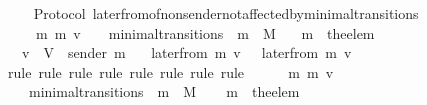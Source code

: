 \begin{isabellebody}
%
\isadelimproof
\ \ %
\endisadelimproof
%
\isatagproof
{}\isamarkupfalse%
%
\endisatagproof
{\isafoldproof}%
%
\isadelimproof
\isanewline
%
\endisadelimproof
\isanewline
\isanewline
\isanewline
\isanewline
\isanewline
\isanewline
{}\isamarkupfalse%
\ {\isacharparenleft}\ Protocol{\isacharparenright}\ later{\isacharunderscore}from{\isacharunderscore}of{\isacharunderscore}non{\isacharunderscore}sender{\isacharunderscore}not{\isacharunderscore}affected{\isacharunderscore}by{\isacharunderscore}minimal{\isacharunderscore}transitions\ {\isacharcolon}\isanewline
\ \ {\isachardoublequoteopen}{\isasymforall}\ {\isasymsigma}\ {\isasymsigma}{\isacharprime}\ m\ m{\isacharprime}\ v{\isachardot}\ {\isacharparenleft}{\isasymsigma}{\isacharcomma}\ {\isasymsigma}{\isacharprime}{\isacharparenright}\ {\isasymin}\ minimal{\isacharunderscore}transitions\ {\isasymand}\ m\ {\isasymin}\ M\isanewline
\ \ {\isasymlongrightarrow}\ m{\isacharprime}\ {\isacharequal}\ the{\isacharunderscore}elem\ {\isacharparenleft}{\isasymsigma}{\isacharprime}\ {\isacharminus}\ {\isasymsigma}{\isacharparenright}\isanewline
\ \ {\isasymlongrightarrow}\ v\ {\isasymin}\ V\ {\isacharminus}\ {\isacharbraceleft}sender\ m{\isacharprime}{\isacharbraceright}\isanewline
\ \ {\isasymlongrightarrow}\ later{\isacharunderscore}from\ {\isacharparenleft}m{\isacharcomma}\ v{\isacharcomma}\ {\isasymsigma}{\isacharparenright}\ {\isacharequal}\ later{\isacharunderscore}from\ {\isacharparenleft}m{\isacharcomma}\ v{\isacharcomma}\ {\isasymsigma}{\isacharprime}{\isacharparenright}{\isachardoublequoteclose}\isanewline
%
\isadelimproof
\ \ %
\endisadelimproof
%
\isatagproof
{}\isamarkupfalse%
\ {\isacharparenleft}rule{\isacharcomma}\ rule{\isacharcomma}\ rule{\isacharcomma}\ rule{\isacharcomma}\ rule{\isacharcomma}\ rule{\isacharcomma}\ rule{\isacharcomma}\ rule{\isacharparenright}\isanewline
{}\isamarkupfalse%
{\isacharminus}\isanewline
\ \ \isamarkupfalse%
\ {\isasymsigma}\ {\isasymsigma}{\isacharprime}\ m\ m{\isacharprime}\ v\isanewline
\ \ \isamarkupfalse%
\ {\isachardoublequoteopen}{\isacharparenleft}{\isasymsigma}{\isacharcomma}\ {\isasymsigma}{\isacharprime}{\isacharparenright}\ {\isasymin}\ minimal{\isacharunderscore}transitions\ {\isasymand}\ m\ {\isasymin}\ M{\isachardoublequoteclose}\isanewline
\ \ \isamarkupfalse%
\ {\isachardoublequoteopen}m{\isacharprime}\ {\isacharequal}\ the{\isacharunderscore}elem\ {\isacharparenleft}{\isasymsigma}{\isacharprime}\ {\isacharminus}\ {\isasymsigma}{\isacharparenright}{\isachardoublequoteclose}\isanewline

\end{isabellebody}
